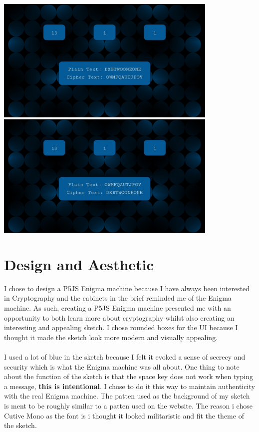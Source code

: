 \documentclass[12pt,a4paper]{article}
\begin{document}
		\begin{center}
			\includegraphics[width=0.8\textwidth]{figures/figure1.jpg}\\
			\vspace{0.5cm}
			\includegraphics[width=0.8\textwidth]{figures/figure2.jpg}\\
		\end{center}
	
	\newpage

	\section{Design and Aesthetic}
		I chose to design a P5JS Enigma machine because I have always been interested 
		in Cryptography and the cabinets in the brief reminded me of the Enigma machine. 
		As such, creating a P5JS Enigma machine presented me with an opportunity to 
		both learn more about cryptography whilst also creating an interesting and appealing 
		sketch. I chose rounded boxes for the UI because I thought it made the sketch look 
		more modern and visually appealing.\\
		\\
		I used a lot of blue in the sketch because I felt it evoked a sense of secrecy and 
		security which is what the Enigma machine was all about. One thing to note about the 
		function of the sketch is that the space key does not work when typing a message, 
		\textbf{this is intentional}. I chose to do it this way to maintain authenticity 
		with the real Enigma machine. The patten used as the background of my sketch is ment 
		to be roughly similar to a patten used on the \textcite{ASD2023} website. The reason 
		i chose Cutive Mono as the font is i thought it looked militaristic and fit the 
		theme of the sketch.\\
\end{document}
